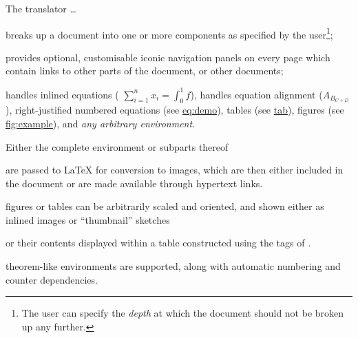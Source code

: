 \smallskip\noindent
The \latextohtml{} translator \dots
%
\begin{itemize}
\item
breaks up a document into one or more components as specified
by the user\footnote{The user can specify the \emph{depth} at which
the document should not be broken up any further.};

%
\item
provides optional, customisable iconic navigation
panels on every page which contain links to other parts of the
document, or other documents;

%
%
%
\item
handles inlined equations ( \(\sum_{i=1}^{n} x_{i} = \int_{0}^{1} f \)),
handles equation alignment ($A_{B_{C+D}}$),
right-justified numbered equations (see \hyperref{example}{equation~}{}{eq:demo}),
tables (see \hyperref{example}{Table~}{}{tab}),
figures (see \hyperref{example}{Figure~}{}{fig:example}),
and \emph{any arbitrary environment}.
\begin{changebar}%
Either the complete environment or subparts thereof\html{\dots}
\end{changebar}%
are passed to \LaTeX{}  for conversion to images, which are then either included
in the document or are made available through hypertext links.

%
%
%
\begin{changebar}%
\item
figures or tables can be arbitrarily scaled and oriented,
and shown either as inlined images or ``thumbnail'' sketches\html{\dots}
\begin{changebar}
or their contents displayed within a table constructed
using the  tags of \HTMLiii.
\end{changebar}\end{changebar}

%
%
%
%
\begin{changebar}
\item
theorem-like environments are supported, along with
automatic numbering and counter dependencies.
\end{changebar}%


\end{itemize}
